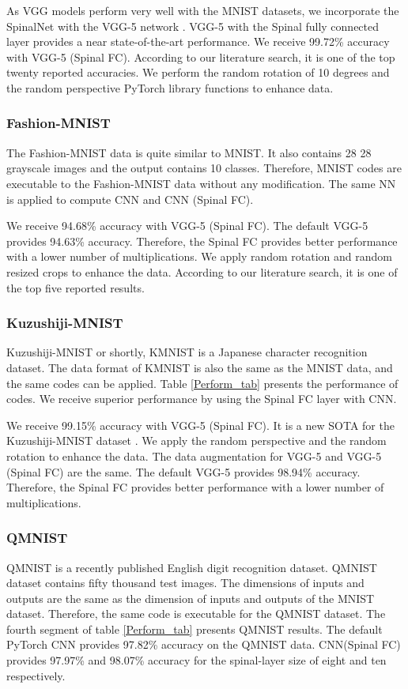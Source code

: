 \documentclass[journal]{IEEEtran}
\begin{document}
As VGG models perform very well with the MNIST datasets, we incorporate the SpinalNet with the VGG-5 network \cite{VGG5}. VGG-5 with the Spinal fully connected layer provides a near state-of-the-art performance. We receive 99.72\% accuracy with VGG-5 (Spinal FC). According to our literature search, it is one of the top twenty reported accuracies. We perform the random rotation of 10 degrees and the random perspective PyTorch library functions to enhance data. 


\subsubsection{Fashion-MNIST}
The Fashion-MNIST data is quite similar to MNIST. It also contains 28  28 grayscale images and the output contains 10 classes. Therefore, MNIST codes are executable to the Fashion-MNIST data without any modification. The same NN is applied to compute CNN and CNN (Spinal FC).  

We receive 94.68\% accuracy with VGG-5 (Spinal FC). The default VGG-5 provides 94.63\% accuracy. Therefore, the Spinal FC provides better performance with a lower number of multiplications. We apply random rotation and random resized crops to enhance the data. According to our literature search, it is one of the top five reported results.



\subsubsection{Kuzushiji-MNIST}
Kuzushiji-MNIST or shortly, KMNIST is a Japanese character recognition dataset. The data format of KMNIST is also the same as the MNIST data, and the same codes can be applied. Table \ref{Perform_tab} presents the performance of codes. We receive superior performance by using the Spinal FC layer with CNN.

We receive 99.15\% accuracy with VGG-5 (Spinal FC). 
It is a new SOTA for the Kuzushiji-MNIST dataset \cite{nokland2019training,tissera2019context}. We apply the random perspective and the random rotation to enhance the data.
The data augmentation for VGG-5 and VGG-5  (Spinal FC) are the same. The default VGG-5 provides 98.94\% accuracy. Therefore, the Spinal FC provides better performance with a lower number of multiplications. 


\subsubsection{QMNIST}
QMNIST is a recently published English digit recognition dataset. QMNIST dataset contains fifty thousand test images. The dimensions of inputs and outputs are the same as the dimension of inputs and outputs of the MNIST dataset. Therefore, the same code is executable for the QMNIST dataset. The fourth segment of table \ref{Perform_tab} presents QMNIST results. The default PyTorch CNN provides 97.82\% accuracy on the QMNIST data. CNN(Spinal FC) provides 97.97\% and 98.07\% accuracy for the spinal-layer size of eight and ten respectively. 
\end{document}
